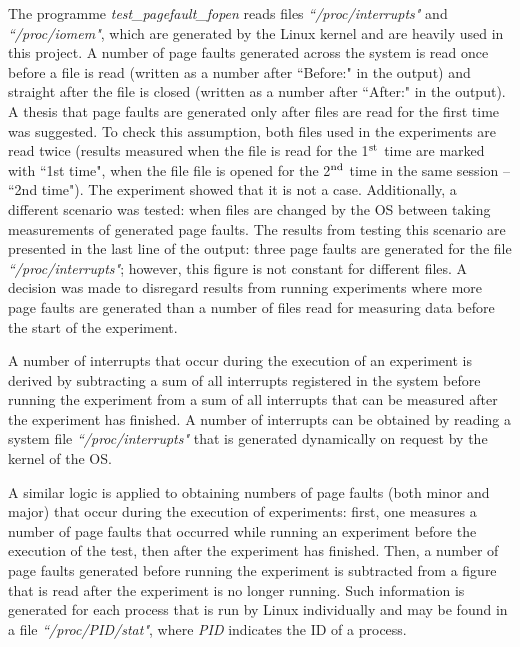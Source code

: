 The programme \textit{test\_pagefault\_fopen} reads files \textit{``/proc/interrupts"} and \textit{``/proc/iomem"}, which are generated by the Linux kernel and are heavily used in this project. A number of page faults generated across the system is read once before a file is read (written as a number after ``Before:" in the output) and straight after the file is closed (written as a number after ``After:" in the output). A thesis that page faults are generated only after files are read for the first time was suggested. To check this assumption, both files used in the experiments are read twice (results measured when the file is read for the 1$^{\textnormal{st}}$ time are marked with ``1st time", when the file file is opened for the 2$^{\textnormal{nd}}$ time in the same session -- ``2nd time"). The experiment showed that it is not a case. Additionally, a different scenario was tested: when files are changed by the OS between taking measurements of generated page faults. The results from testing this scenario are presented in the last line of the output: three page faults are generated for the file \textit{``/proc/interrupts"}; however, this figure is not constant for different files. A decision was made to disregard results from running experiments where more page faults are generated than a number of files read for measuring data before the start of the experiment.

A number of interrupts that occur during the execution of an experiment is derived by subtracting a sum of all interrupts registered in the system before running the experiment from a sum of all interrupts that can be measured after the experiment has finished. A number of interrupts can be obtained by reading a system file \textit{``/proc/interrupts"} that is generated dynamically on request by the kernel of the OS.

A similar logic is applied to obtaining numbers of page faults (both minor and major) that occur during the execution of experiments: first, one measures a number of page faults that occurred while running an experiment before the execution of the test, then after the experiment has finished. Then, a number of page faults generated before running the experiment is subtracted from a figure that is read after the experiment is no longer running. Such information is generated for each process that is run by Linux individually and may be found in a file \textit{``/proc/PID/stat"}, where \textit{PID} indicates the ID of a process.

